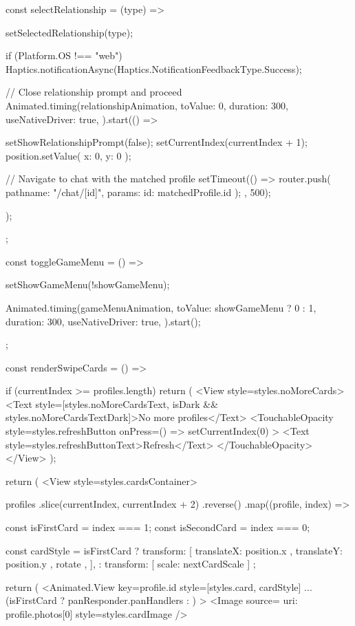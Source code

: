 {  const selectRelationship = (type) => {
    setSelectedRelationship(type);
    
    if (Platform.OS !== "web") {
      Haptics.notificationAsync(Haptics.NotificationFeedbackType.Success);
    }
    
    // Close relationship prompt and proceed
    Animated.timing(relationshipAnimation, {
      toValue: 0,
      duration: 300,
      useNativeDriver: true,
    }).start(() => {
      setShowRelationshipPrompt(false);
      setCurrentIndex(currentIndex + 1);
      position.setValue({ x: 0, y: 0 });
      
      // Navigate to chat with the matched profile
      setTimeout(() => {
        router.push({
          pathname: "/chat/[id]",
          params: { id: matchedProfile.id }
        });
      }, 500);
    });
  };

  const toggleGameMenu = () => {
    setShowGameMenu(!showGameMenu);
    
    Animated.timing(gameMenuAnimation, {
      toValue: showGameMenu ? 0 : 1,
      duration: 300,
      useNativeDriver: true,
    }).start();
  };
  
  const renderSwipeCards = () => {
    if (currentIndex >= profiles.length) {
      return (
        <View style={styles.noMoreCards}>
          <Text style={[styles.noMoreCardsText, isDark && styles.noMoreCardsTextDark]}>No more profiles</Text>
          <TouchableOpacity 
            style={styles.refreshButton}
            onPress={() => setCurrentIndex(0)}
          >
            <Text style={styles.refreshButtonText}>Refresh</Text>
          </TouchableOpacity>
        </View>
      );
    }
    
    return (
      <View style={styles.cardsContainer}>
        {profiles
          .slice(currentIndex, currentIndex + 2)
          .reverse()
          .map((profile, index) => {
            const isFirstCard = index === 1;
            const isSecondCard = index === 0;
            
            const cardStyle = isFirstCard
              ? {
                  transform: [
                    { translateX: position.x },
                    { translateY: position.y },
                    { rotate },
                  ],
                }
              : { transform: [{ scale: nextCardScale }] };
            
            return (
              <Animated.View
                key={profile.id}
                style={[styles.card, cardStyle]}
                {...(isFirstCard ? panResponder.panHandlers : {})}
              >
                <Image source={{ uri: profile.photos[0] }} style={styles.cardImage} />
                
}}}}

